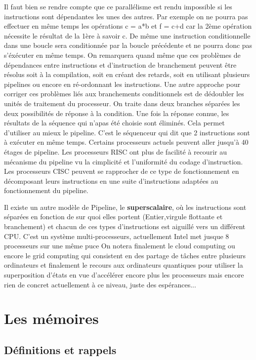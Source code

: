 \documentclass{report}
\begin{document}
Il faut bien se rendre compte que ce parallélisme est rendu impossible si les instructions sont dépendantes les unes des autres. Par exemple on ne pourra pas effectuer en même temps les opérations c = a*b et f = c+d car la 2ème opération nécessite le résultat de la 1ère à savoir c.
De même une instruction conditionnelle dans une boucle sera conditionnée par la boucle précédente et ne pourra donc pas s'éxécuter en même temps.
On remarquera quand même que ces problèmes de dépendances entre instructions et d'instruction de branchement peuvent être résolus soit à la compilation, soit en créant des retards, soit en utilisant plusieurs pipelines ou encore en ré-ordonnant les instructions.
Une autre approche pour corriger ces problèmes liés aux branchements conditionnels est de dédoubler les unités de traitement du processeur. On traite dans deux branches séparées les deux possibilités de réponse à la condition. Une fois la réponse connue, les résultats de la séquence qui n'apas été choisie sont éliminés. Cela permet d'utiliser au mieux le pipeline.
 C'est le séquenceur qui dit que 2 instructions sont à exécuter en même temps. Certains processeurs actuels peuvent aller jusqu'à 40 étages de pipeline. Les processeurs RISC ont plus de facilité à recourir au mécanisme du pipeline vu la cimplicité et l'uniformité du codage d'instruction. Les processeurs CISC peuvent se rapprocher de ce type de fonctionnement en décomposant leurs instructions en une suite d'instructions adaptées au fonctionnement du pipeline.

Il existe un autre modèle de Pipeline, le {\bf superscalaire}, où les instructions sont séparées en fonction de sur quoi elles portent (Entier,virgule flottante et branchement) et chacun de ces types d'instructions est aiguillé vers un différent CPU. C'est un système multi-processeurs, actuellement Intel met jusque 8 processeurs sur une même puce
On notera finalement le cloud computing ou encore le grid computing qui consistent en des partage de tâches entre plusieurs ordinateurs et finalement le recours aux ordinateurs quantiques pour utiliser la superposition d'états en vue d'accélérer encore plus les processeurs mais encore rien de concret actuellement à ce niveau, juste des espérances...

\chapter{Les mémoires}




\section{Définitions et rappels}
\end{document}
